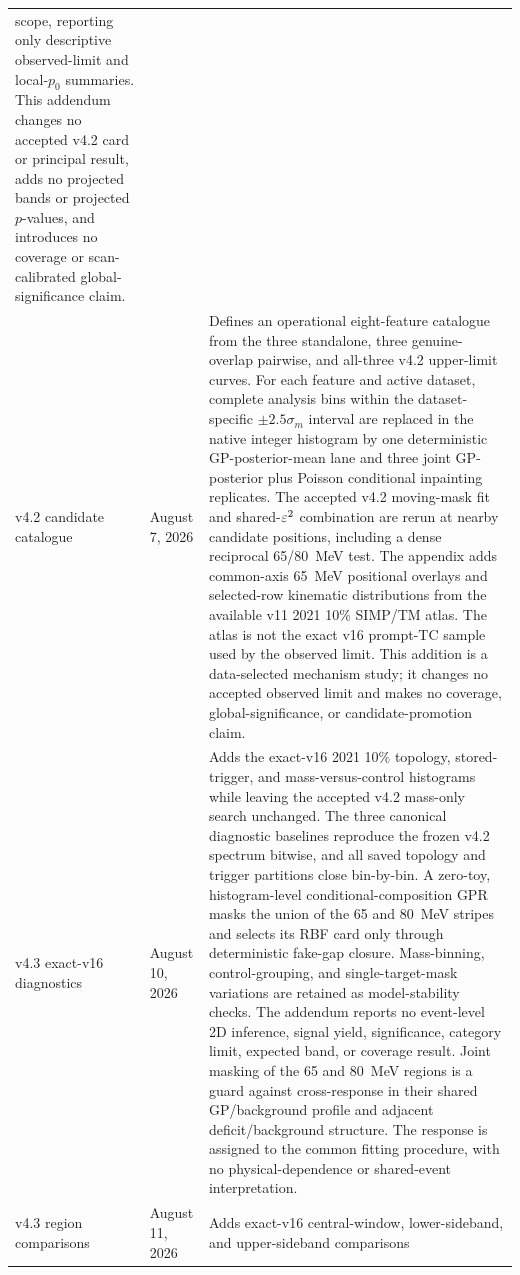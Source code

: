 \begin{longtable}{P{0.11\textwidth}P{0.16\textwidth}P{0.64\textwidth}}
scope, reporting only descriptive observed-limit and local-$p_0$ summaries.
This addendum changes no accepted v4.2 card or principal result, adds no
projected bands or projected $p$-values, and introduces no coverage or
scan-calibrated global-significance claim. \\
\addlinespace
v4.2 candidate catalogue & August 7, 2026 &
Defines an operational eight-feature catalogue from the three standalone,
three genuine-overlap pairwise, and all-three v4.2 upper-limit curves.  For
each feature and active dataset, complete analysis bins within the
dataset-specific $\pm2.5\sigma_m$ interval are replaced in the native integer
histogram by one deterministic GP-posterior-mean lane and three joint
GP-posterior plus Poisson conditional inpainting replicates.  The accepted
v4.2 moving-mask fit and shared-$\varepsilon^2$ combination are rerun at nearby
candidate positions, including a dense reciprocal 65/80~MeV test.  The
appendix adds common-axis 65~MeV positional overlays and selected-row
kinematic distributions from the available v11 2021 10\% SIMP/TM atlas.  The
atlas is not the exact v16 prompt-TC sample used by the observed limit.  This
addition is a data-selected mechanism study; it changes no accepted observed
limit and makes no coverage, global-significance, or candidate-promotion
claim. \\
\addlinespace
v4.3 exact-v16 diagnostics & August 10, 2026 &
Adds the exact-v16 2021 10\% topology, stored-trigger, and mass-versus-control
histograms while leaving the accepted v4.2 mass-only search unchanged.  The
three canonical diagnostic baselines reproduce the frozen v4.2 spectrum
bitwise, and all saved topology and trigger partitions close bin-by-bin.  A
zero-toy, histogram-level conditional-composition GPR masks the union of the
65 and 80~MeV stripes and selects its RBF card only through deterministic
fake-gap closure.  Mass-binning, control-grouping, and single-target-mask
variations are retained as model-stability checks.  The addendum reports no
event-level 2D inference, signal yield, significance, category limit,
expected band, or coverage result.  Joint masking of the 65 and 80~MeV
regions is a guard against cross-response in their shared GP/background
profile and adjacent deficit/background structure.  The response is assigned
to the common fitting procedure, with no physical-dependence or shared-event
interpretation. \\
\addlinespace
v4.3 region comparisons & August 11, 2026 &
Adds exact-v16 central-window, lower-sideband, and upper-sideband comparisons

\end{longtable}
